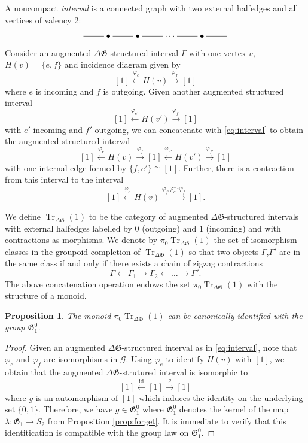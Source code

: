 \documentclass[english,11pt,leqno]{article}
\def\Gen{\mathfrak{G}}
\def\id{\operatorname{id}}
\def\on{\operatorname}
\def\lra{\longrightarrow}
\def\lla{\longleftarrow}
\def\Tr{\on{Tr}}
\def\G{ {\mathcal G}}
\def\DG{ {\Delta \Gen}}
\newtheorem{prop}[thm]{Proposition}
\theoremstyle{definition}
\theoremstyle{remark}
\numberwithin{equation}{section}
\begin{document}
A noncompact {\em interval} is a connected graph with two external halfedges and all vertices of valency $2$:   
\[
	\xymatrix{
		\ar@{-}[r] & \bullet \ar@{-}[r] & \bullet \ar@{-}[r]  & \cdots \ar@{-}[r] & \bullet
		\ar@{-}[r]  & 
	}
\]
Consider an augmented $\DG$-structured interval $\Gamma$ with one vertex $v$, $H(v) = \{e,f\}$ and incidence diagram given by
\begin{equation}\label{eq:interval}
    [1] \overset{\varphi_e}{\lla} H(v) \overset{\varphi_f}{\lra} [1]
\end{equation}
where $e$ is incoming and $f$ is outgoing. Given another augmented structured interval 
\[
  [1] \overset{\varphi_{e'}}{\lla} H(v') \overset{\varphi_{f'}}{\lra} [1]
\]
with $e'$ incoming and $f'$ outgoing, we can concatenate with \eqref{eq:interval} to obtain the
augmented structured interval
\[
  [1] \overset{\varphi_e}{\lla} H(v) \overset{\varphi_f}{\lra} [1] \overset{\varphi_{e'}}{\lla} H(v') \overset{\varphi_{f'}}{\lra} [1]
\]
with one internal edge formed by $\{f,e'\} \cong [1]$. Further, there is a contraction from this
interval to the interval 
\[
  [1] \overset{\varphi_{e}}{\lla} H(v) \overset{\varphi_{f'} \varphi_{e'}^{-1} \varphi_{f}}{\lra} [1].
\]

We define $\Tr_{\DG}(1)$ to be the category of augmented $\DG$-structured intervals with external
halfedges labelled by $0$ (outgoing) and $1$ (incoming) and with contractions as morphisms. We denote 
by $\pi_0\Tr_{\DG}(1)$ the set of isomorphism classes in the groupoid completion of $\Tr_{\DG}(1)$ so 
that two objects $\Gamma$,$\Gamma'$ are in the same class if and only if there exists a chain of zigzag 
contractions 
\[
	\Gamma \lla \Gamma_1 \lra \Gamma_2 \lla \dots \lra \Gamma'.
\]
The above concatenation operation endows the set $\pi_0 \Tr_{\DG}(1)$ with the structure of a
monoid.

\begin{prop} The monoid $\pi_0 \Tr_{\DG}(1)$ can be canonically identified with the group $\Gen_1^0$.  
\end{prop}
\begin{proof} Given an augmented $\DG$-structured interval as in \eqref{eq:interval}, note that
	$\varphi_e$ and $\varphi_f$ are isomorphisms in $\G$. Using $\varphi_e$ to identify $H(v)$
	with $[1]$, we obtain that the augmented $\DG$-strutured interval is isomorphic to \[ [1]
	\overset{\id}{\lla} [1] \overset{g}{\lra} [1] \] where $g$ is an automorphism of $[1]$ which
	induces the identity on the underlying set $\{0,1\}$. Therefore, we have $g \in \Gen_1^0$
	where $\Gen_1^0$ denotes the kernel of the map $\lambda: \Gen_1 \to S_2$ from Proposition
	\ref{prop:forget}. It is immediate to verify that this identitication is compatible with the
	group law on $\Gen_1^0$.
\end{proof}
\end{document}
